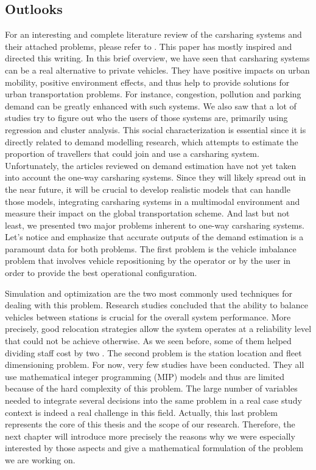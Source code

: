 \begin{bibunit}[ieeetr]
\subsection{Outlooks}

For an interesting and complete literature review of the carsharing systems and their attached problems, please refer to \cite{jorge_carsharing_2013}.
This paper has mostly inspired and directed this writing.
In this brief overview, we have seen that carsharing systems can be a real alternative to private vehicles.
They have positive impacts on urban mobility, positive environment effects, and thus help to provide solutions for urban transportation problems.
For instance, congestion, pollution and parking demand can be greatly enhanced with such systems.
We also saw that a lot of studies try to figure out who the users of those systems are, primarily
using regression and cluster analysis.
This social characterization is essential since it is directly related to demand modelling research, which attempts to estimate the proportion of
travellers that could join and use a carsharing system.
Unfortunately, the articles reviewed on demand estimation have not yet taken into account the one-way carsharing systems.
Since they will likely spread out in the near future, it will be crucial to develop realistic models that can handle those models, integrating carsharing systems in a multimodal environment and measure their impact on the global transportation scheme.
And last but not least, we presented two major problems inherent to one-way carsharing systems.
Let's notice and emphasize that accurate outputs of the demand estimation is a paramount data for both problems.
The first problem is the vehicle imbalance problem that involves vehicle repositioning by the operator or by the user in order to provide the best operational configuration.

Simulation and optimization are the two most commonly used techniques for dealing with this problem.
Research studies concluded that the ability to balance vehicles between stations is crucial for the overall system performance.
More precisely, good relocation strategies allow the system operates at a reliability level that could not be achieve otherwise.
As we seen before, some of them helped dividing staff cost by two \cite{kek_decision_2009}.
The second problem is the station location and  fleet dimensioning problem.
For now, very few studies have been conducted.
They all use mathematical integer programming (MIP) models and thus are limited because of the hard complexity of this problem.
The large number of variables needed to integrate several decisions into the same problem in a real case study context is indeed a real challenge in this field.
Actually, this last problem represents the core of this thesis and the scope of our research.
Therefore, the next chapter will introduce more precisely the reasons why we were especially interested by those aspects and give a mathematical formulation of the problem we are working on.


\end{bibunit}
